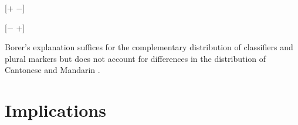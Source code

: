 \documentclass[output=paper]{langsci/langscibook}
\begin{document}
\begin{exe}
\ex\label{ex:key:23.14}
\begin{minipage}[t]{.5\textwidth}

     {}[+\Clf{} −\Pl]\\

\end{minipage}
\begin{minipage}[t]{.5\textwidth}

     {}[−\Clf{} +\Pl]\\

\end{minipage}
\end{exe}

Borer’s explanation suffices for the complementary distribution of classifiers
and plural markers but does not account for differences in the distribution of
Cantonese and Mandarin .

\section{Implications}
\end{document}
